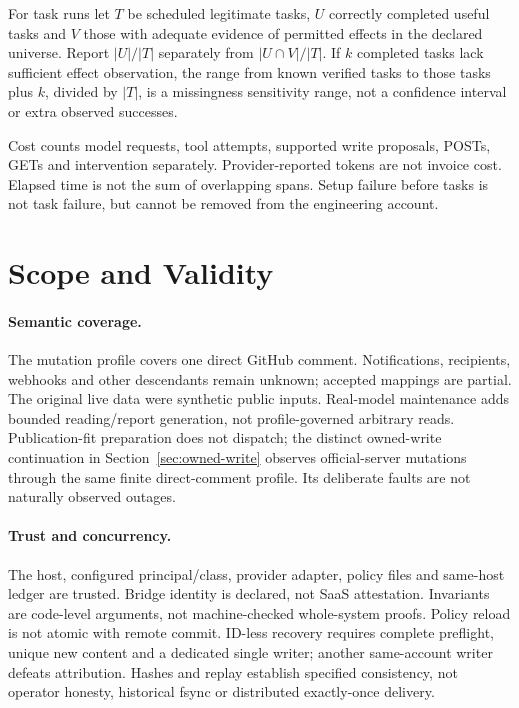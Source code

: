 \documentclass[11pt,letterpaper]{article}
\begin{document}
For task runs let $T$ be scheduled legitimate tasks, $U$ correctly completed
useful tasks and $V$ those with adequate evidence of permitted effects in the
declared universe. Report $|U|/|T|$ separately from $|U\cap V|/|T|$. If $k$
completed tasks lack sufficient effect observation, the range from known
verified tasks to those tasks plus $k$, divided by $|T|$, is a missingness
sensitivity range, not a confidence interval or extra observed successes.

Cost counts model requests, tool attempts, supported write proposals, POSTs,
GETs and intervention separately. Provider-reported tokens are not invoice
cost. Elapsed time is not the sum of overlapping spans. Setup failure before
tasks is not task failure, but cannot be removed from the engineering account.

\section{Scope and Validity}

\paragraph{Semantic coverage.}
The mutation profile covers one direct GitHub comment. Notifications, recipients,
webhooks and other descendants remain unknown; accepted mappings are partial.
The original live data were synthetic public inputs. Real-model maintenance
adds bounded reading/report generation, not profile-governed arbitrary reads.
Publication-fit preparation does not dispatch; the distinct owned-write
continuation in Section~\ref{sec:owned-write} observes official-server mutations
through the same finite direct-comment profile. Its deliberate faults are not
naturally observed outages.

\paragraph{Trust and concurrency.}
The host, configured principal/class, provider adapter, policy files and same-host
ledger are trusted. Bridge identity is declared, not SaaS attestation. Invariants
are code-level arguments, not machine-checked whole-system proofs. Policy reload
is not atomic with remote commit. ID-less recovery requires complete preflight,
unique new content and a dedicated single writer; another same-account writer
defeats attribution. Hashes and replay establish specified consistency, not
operator honesty, historical fsync or distributed exactly-once delivery.
\end{document}

